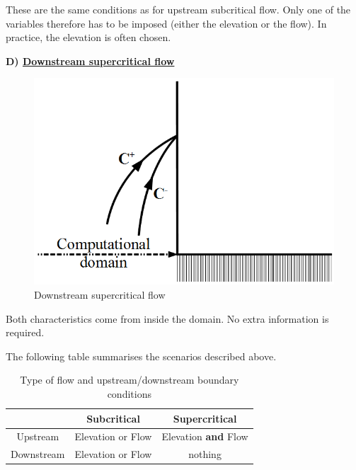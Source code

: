 These are the same conditions as for upstream subcritical flow. Only one of the variables therefore has to be imposed (either the elevation or the flow). In practice, the elevation is often chosen.

\newpage

\textbf{D) \underline{Downstream supercritical flow}}

\vspace{0.5cm}

\begin{figure}[h]
 \begin{center}
  \includegraphics[scale=1.]{Figures/AvalTorrentiel.eps}
  \caption{Downstream supercritical flow}
 \end{center}
\end{figure}

Both characteristics come from inside the domain. No extra information is required.

\vspace{0.5cm}

The following table summarises the scenarios described above.

\begin{table}[h]
\centering  
\caption{Type of flow and upstream/downstream boundary conditions}
\begin{tabular}{c|c|c}
  &\textbf{Subcritical} & \textbf{Supercritical} \\
  \hline
  Upstream & Elevation or Flow & Elevation \textbf{and} Flow \\
  Downstream & Elevation or Flow & nothing \\
  \hline
 \end{tabular}
 \label{TabCL}
\end{table}

